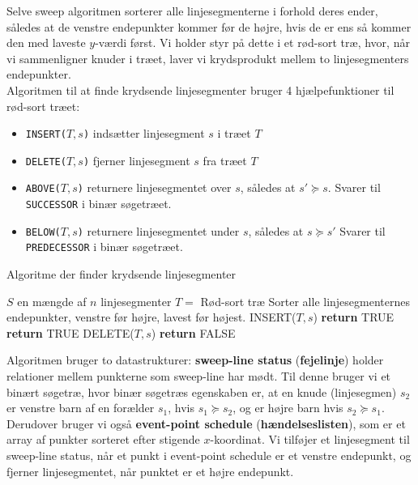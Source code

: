 Selve sweep algoritmen sorterer alle linjesegmenterne i forhold deres ender, således at de venstre endepunkter kommer før de højre, hvis de er ens så kommer den med laveste $y$-værdi først. Vi holder styr på dette i et rød-sort træ, hvor, når vi sammenligner knuder i træet, laver vi krydsprodukt mellem to linjesegmenters endepunkter.\\

Algoritmen til at finde krydsende linjesegmenter bruger 4 hjælpefunktioner til rød-sort træet:
\begin{itemize}
\item \texttt{INSERT($T,s$)} indsætter linjesegment $s$ i træet $T$
\item \texttt{DELETE($T,s$)} fjerner linjesegment $s$ fra træet $T$
\item \texttt{ABOVE($T,s$)} returnere linjesegmentet over $s$, således at $s' \succeq s$. Svarer til \texttt{SUCCESSOR} i binær søgetræet.
\item \texttt{BELOW($T,s$)} returnere linjesegmentet under $s$, således at $s \succeq s'$ Svarer til \texttt{PREDECESSOR} i binær søgetræet.
\end{itemize}

\begin{algorithm}[H]
  \caption{Algoritme der finder krydsende linjesegmenter}
  \begin{algorithmic}[1]
    \State $S$ en mængde af $n$ linjesegmenter
    \State $T =$ Rød-sort træ
    \State Sorter alle linjesegmenternes endepunkter, venstre før højre, lavest før højest.
    \State INSERT($T,s$)
    \State \textbf{return} TRUE 
    \EndIf
    \EndIf
    \State \textbf{return} TRUE
    \EndIf
    \State DELETE($T,s$)
    \EndIf
    \EndFor
    \State \textbf{return} FALSE
    \EndFunction
  \end{algorithmic}
\end{algorithm}

Algoritmen bruger to datastrukturer: \textbf{sweep-line status} (\textbf{fejelinje}) holder relationer mellem punkterne som sweep-line har mødt. Til denne bruger vi et binært søgetræ, hvor binær søgetræs egenskaben er, at en knude (linjesegmen) $s_2$ er venstre barn af en forælder $s_1$, hvis $s_1 \succeq s_2$, og er højre barn hvis $s_2 \succeq s_1$. Derudover bruger vi også \textbf{event-point schedule} (\textbf{hændelseslisten}), som er et array af punkter sorteret efter stigende $x$-koordinat. Vi tilføjer et linjesegment til sweep-line status, når et punkt i event-point schedule er et venstre endepunkt, og fjerner linjesegmentet, når punktet er et højre endepunkt.\\

